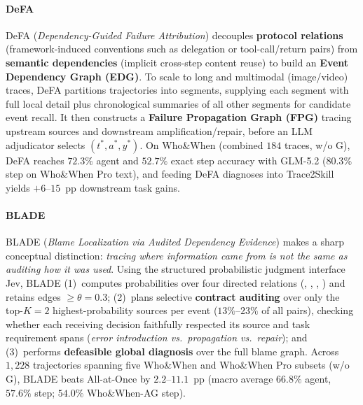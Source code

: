 \paragraph{DeFA~\citep{anonymous2027defa}}
DeFA (\emph{Dependency-Guided Failure Attribution}) decouples \textbf{protocol relations} (framework-induced conventions such as delegation or tool-call/return pairs) from \textbf{semantic dependencies} (implicit cross-step content reuse) to build an \textbf{Event Dependency Graph (EDG)}. To scale to long and multimodal (image/video) traces, DeFA partitions trajectories into segments, supplying each segment with full local detail plus chronological summaries of all other segments for candidate event recall. It then constructs a \textbf{Failure Propagation Graph (FPG)} tracing upstream sources and downstream amplification/repair, before an LLM adjudicator selects $(t^*, a^*, y^*)$. On Who\&When (combined $184$ traces, w/o G), DeFA reaches $72.3\%$ agent and $52.7\%$ exact step accuracy with GLM-5.2 ($80.3\%$ step on Who\&When Pro text), and feeding DeFA diagnoses into Trace2Skill yields $+6$--$15$~pp downstream task gains.

\paragraph{BLADE~\citep{guo2026blade}}
BLADE (\emph{Blame Localization via Audited Dependency Evidence}) makes a sharp conceptual distinction: \emph{tracing where information came from is not the same as auditing how it was used}. Using the structured probabilistic judgment interface Jev, BLADE (1)~computes probabilities over four directed relations (, , , ) and retains edges $\ge \theta=0.3$; (2)~plans selective \textbf{contract auditing} over only the top-$K=2$ highest-probability sources per event ($13\%$--$23\%$ of all pairs), checking whether each receiving decision faithfully respected its source and task requirement spans (\emph{error introduction vs.\ propagation vs.\ repair}); and (3)~performs \textbf{defeasible global diagnosis} over the full blame graph. Across $1{,}228$ trajectories spanning five Who\&When and Who\&When Pro subsets (w/o G), BLADE beats All-at-Once by $2.2$--$11.1$~pp (macro average $66.8\%$ agent, $57.6\%$ step; $54.0\%$ Who\&When-AG step).

